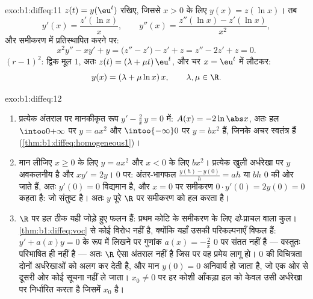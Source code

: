 \begin{solution}{exo:b1:diffeq:11}
$z(t) = y(\eu^t)$ रखिए, जिससे $x > 0$ के लिए $y(x) = z(\ln x)$। तब
\[
y'(x) = \frac{z'(\ln x)}x,
\qquad
y''(x) = \frac{z''(\ln x) - z'(\ln x)}{x^2} ,
\]
और समीकरण में प्रतिस्थापित करने पर:
\[
x^2y'' - xy' + y = \bigl(z'' - z'\bigr) - z' + z
= z'' - 2z' + z = 0 .
\]
 $(r - 1)^2$: द्विक मूल $1$, अतः $z(t) = (\lambda + \mu
t)\,\eu^t$, और चर $x = \eu^t$ में लौटकर:
\[
y(x) = (\lambda + \mu\ln x)\,x,
\qquad \lambda, \mu \in \R .
\]
\end{solution}

\begin{solution}{exo:b1:diffeq:12}
\begin{enumerate}
  \item प्रत्येक अंतराल पर मानकीकृत रूप $y' - \frac2x\,y = 0$ में: $A(x) =
  -2\ln\abs x$, अतः हल $\intoo0{+\infty}$ पर $y = a x^2$ और
  $\intoo{-\infty}0$ पर $y = b x^2$ हैं, जिनके अचर स्वतंत्र हैं
  (\cref{thm:b1:diffeq:homogeneous1})।
  \item मान लीजिए $x \geq 0$ के लिए $y = ax^2$ और $x < 0$ के लिए $bx^2$।
  प्रत्येक खुली अर्धरेखा पर $y$ अवकलनीय है और $xy' = 2y$। $0$ पर: अंतर-भागफल
  $\frac{y(h) - y(0)}h = ah$ या $bh$ $0$ की ओर जाते हैं, अतः $y'(0) = 0$
  विद्यमान है, और $x = 0$ पर समीकरण $0 \cdot y'(0) = 2y(0) = 0$ कहता है: जो
  संतुष्ट है। अतः $y$ पूरे $\R$ पर समीकरण को हल करता है।
  \item $\R$ पर हल ठीक यही जोड़े हुए फलन हैं: प्रथम कोटि के समीकरण के लिए
  \emph{दो}-प्राचल वाला कुल। \cref{thm:b1:diffeq:voc} से कोई विरोध नहीं है,
  क्योंकि यहाँ उसकी परिकल्पनाएँ विफल हैं: $y' + a(x)y = 0$ के रूप में लिखने
  पर गुणांक $a(x) = -\frac2x$ $0$ पर संतत नहीं है --- वस्तुतः परिभाषित ही
  नहीं है --- अतः $\R$ ऐसा अंतराल नहीं है जिस पर वह प्रमेय लागू हो। $0$ की
  विचित्रता दोनों अर्धरेखाओं को अलग कर देती है, और मान $y(0) = 0$ अनिवार्य
  हो जाता है, जो एक ओर से दूसरी ओर कोई सूचना नहीं ले जाता। $x_0 \neq 0$ पर
  हर कोशी आँकड़ा हल को केवल उसी अर्धरेखा पर निर्धारित करता है जिसमें $x_0$
  है।
\end{enumerate}
\end{solution}

